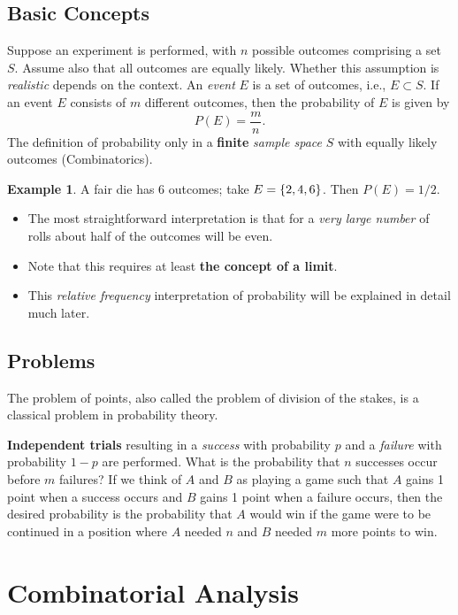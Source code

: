 \documentclass[12pt,a4paper]{article}
\theoremstyle{definition}
\newtheorem{example}{Example}[section]
\theoremstyle{definition}
\theoremstyle{definition}
\theoremstyle{definition}
\theoremstyle{remark}
\theoremstyle{definition}
\begin{document}
\subsection{Basic Concepts}
Suppose an experiment is performed, with $n$ possible outcomes comprising a set $S$. Assume also that all outcomes are equally likely. Whether this assumption is \textit{realistic} depends on the context. An \textit{event} $E$ is a set of outcomes, i.e., $E\subset S$. If an event $E$ consists of $m$ different outcomes, then the probability of $E$ is given by \[
P(E)=\frac{m}{n}.
\] The definition of probability only in a \textbf{finite} \textit{sample space} $S$ with equally likely outcomes (Combinatorics).
\begin{example}
	A fair die has 6 outcomes; take $E=\set{2,4,6}$. Then $P(E)=1/2$.
	\begin{itemize}
		\item The most straightforward interpretation is that for a \textit{very large number} of rolls about half of the outcomes will be even.
		\item Note that this requires at least \textbf{the concept of a limit}.
		\item This \textit{relative frequency} interpretation of probability will be explained in detail much later.
	\end{itemize}
\end{example}

\subsection{Problems}
The problem of points, also called the problem of division of the stakes, is a classical problem in probability theory. 

\textbf{Independent trials} resulting in a \textit{success} with probability $p$ and a \textit{failure} with probability $ 1-p $ are performed. What is the probability that $n$ successes occur before $m$ failures? If we think of $A$ and $B$ as playing a game such that $A$ gains 1 point when a success occurs and $B$ gains 1 point when a failure occurs, then the desired probability is the probability that $A$ would win if the game were to be continued in a position where $A$ needed $n$ and $B$ needed $m$ more points to win.


\newpage\section{Combinatorial Analysis}
\end{document}
